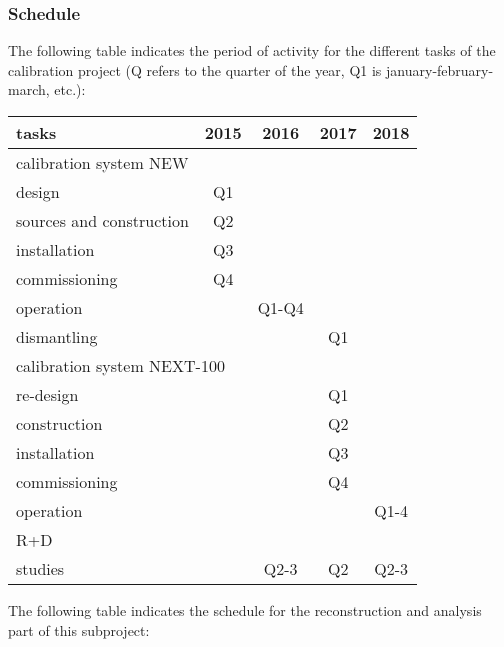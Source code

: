 %
%

\subsubsection*{Schedule}

The following table indicates the period of activity for the different tasks of the calibration project (Q refers to the quarter of the year, Q1 is january-february-march, etc.):

\begin{center}
\begin{tabular}{| l | c | c | c | c |}
\hline
tasks & 2015 & 2016 & 2017 & 2018 \\
\hline
\hline
\multicolumn{5}{|l|}{calibration system NEW}  \\
\hline
\hline
design & Q1 & & &  \\
sources and construction & Q2 & & & \\
installation & Q3 & & & \\
commissioning  & Q4 & & & \\
operation & & Q1-Q4 & & \\
dismantling &  & & Q1 &  \\
\hline
\hline
\multicolumn{5}{|l|}{calibration system NEXT-100}  \\
\hline
\hline
re-design & & & Q1 &  \\
construction  &  & & Q2 & \\
installation &  & & Q3 & \\
commissioning &  & & Q4 & \\
operation &  & & & Q1-4  \\
\hline
\hline
\multicolumn{5}{|l|}{R+D}  \\
\hline
\hline
studies & & Q2-3 & Q2 & Q2-3 \\ 
\hline
\end{tabular}
\end{center}

The following table indicates the schedule for the reconstruction and analysis part of this subproject:

